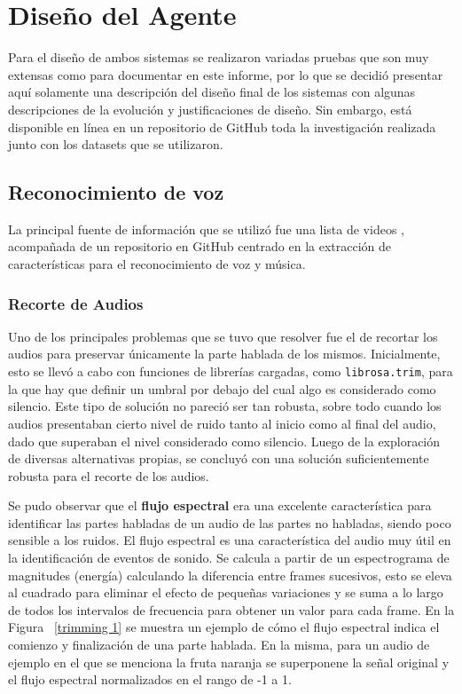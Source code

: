 \documentclass[a4paper, 12pt]{article}
\begin{document}
\section{Diseño del Agente}
Para el diseño de ambos sistemas se realizaron variadas pruebas que son muy extensas como para documentar en este informe, por lo que se decidió presentar aquí solamente una descripción del diseño final de los sistemas con algunas descripciones de la evolución y justificaciones de diseño. Sin embargo, está disponible en línea en un repositorio de GitHub \cite{FruitRecognitionRepo} toda la investigación realizada junto con los datasets que se utilizaron.
\subsection{Reconocimiento de voz}
La principal fuente de información que se utilizó fue una lista de videos \cite{YouTubePlaylist}, acompañada de un repositorio en GitHub \cite{GitHubRepository} centrado en la extracción de características para el reconocimiento de voz y música.
\subsubsection{Recorte de Audios}
Uno de los principales problemas que se tuvo que resolver fue el de recortar los audios para preservar únicamente la parte hablada de los mismos. Inicialmente, esto se llevó a cabo con funciones de librerías cargadas, como \texttt{librosa.trim}, para la que hay que definir un umbral por debajo del cual algo es considerado como silencio. Este tipo de solución no pareció ser tan robusta, sobre todo cuando los audios presentaban cierto nivel de ruido tanto al inicio como al final del audio, dado que superaban el nivel considerado como silencio. Luego de la exploración de diversas alternativas propias, se concluyó con una solución suficientemente robusta para el recorte de los audios.

Se pudo observar que el \textbf{flujo espectral} era una excelente característica para identificar las partes habladas de un audio de las partes no habladas, siendo poco sensible a los ruidos. El flujo espectral es una característica del audio muy útil en la identificación de eventos de sonido. Se calcula a partir de un espectrograma de magnitudes (energía) calculando la diferencia entre frames sucesivos, esto se eleva al cuadrado para eliminar el efecto de pequeñas variaciones y se suma a lo largo de todos los intervalos de frecuencia para obtener un valor para cada frame.
En la Figura ~\ref{trimming 1} se muestra un ejemplo de cómo el flujo espectral indica el comienzo y finalización de una parte hablada. En la misma, para un audio de ejemplo en el que se menciona la fruta naranja se superponene la señal original y el flujo espectral normalizados en el rango de -1 a 1.
\end{document}
